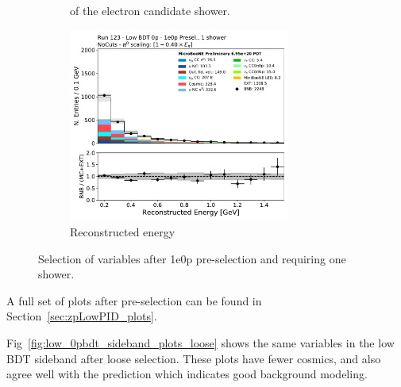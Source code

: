 \begin{figure}[H]
\begin{subfigure}{0.3\textwidth}
    \caption{\dedx of the electron candidate shower.}
    \end{subfigure}
    \begin{subfigure}{0.3\textwidth}
    \includegraphics[width=0.8\textwidth]{1e0p/Low_BDT_Sideband/reco_e_note.pdf}
    \caption{Reconstructed energy}
    \end{subfigure}
    \caption{Selection of variables after 1e0p pre-selection and requiring one shower.} 
    \label{fig:low_0pbdt_sideband_plots}
\end{figure}

A full set of plots after pre-selection can be found in Section~\ref{sec:zpLowPID_plots}. 

Fig~\ref{fig:low_0pbdt_sideband_plots_loose} shows the same variables in the low BDT sideband after loose selection.  These plots have fewer cosmics, and also agree well with the prediction which indicates good background modeling. 

